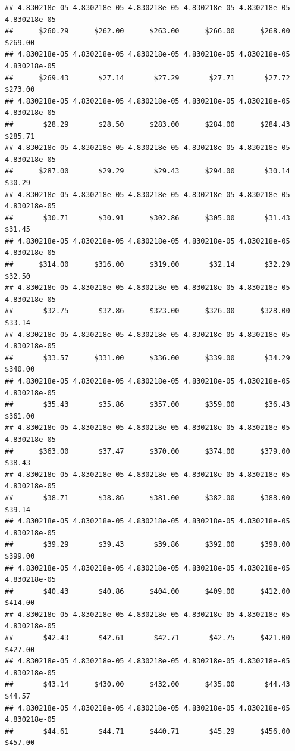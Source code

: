 \begin{verbatim}
## 4.830218e-05 4.830218e-05 4.830218e-05 4.830218e-05 4.830218e-05 4.830218e-05 
##      $260.29      $262.00      $263.00      $266.00      $268.00      $269.00 
## 4.830218e-05 4.830218e-05 4.830218e-05 4.830218e-05 4.830218e-05 4.830218e-05 
##      $269.43       $27.14       $27.29       $27.71       $27.72      $273.00 
## 4.830218e-05 4.830218e-05 4.830218e-05 4.830218e-05 4.830218e-05 4.830218e-05 
##       $28.29       $28.50      $283.00      $284.00      $284.43      $285.71 
## 4.830218e-05 4.830218e-05 4.830218e-05 4.830218e-05 4.830218e-05 4.830218e-05 
##      $287.00       $29.29       $29.43      $294.00       $30.14       $30.29 
## 4.830218e-05 4.830218e-05 4.830218e-05 4.830218e-05 4.830218e-05 4.830218e-05 
##       $30.71       $30.91      $302.86      $305.00       $31.43       $31.45 
## 4.830218e-05 4.830218e-05 4.830218e-05 4.830218e-05 4.830218e-05 4.830218e-05 
##      $314.00      $316.00      $319.00       $32.14       $32.29       $32.50 
## 4.830218e-05 4.830218e-05 4.830218e-05 4.830218e-05 4.830218e-05 4.830218e-05 
##       $32.75       $32.86      $323.00      $326.00      $328.00       $33.14 
## 4.830218e-05 4.830218e-05 4.830218e-05 4.830218e-05 4.830218e-05 4.830218e-05 
##       $33.57      $331.00      $336.00      $339.00       $34.29      $340.00 
## 4.830218e-05 4.830218e-05 4.830218e-05 4.830218e-05 4.830218e-05 4.830218e-05 
##       $35.43       $35.86      $357.00      $359.00       $36.43      $361.00 
## 4.830218e-05 4.830218e-05 4.830218e-05 4.830218e-05 4.830218e-05 4.830218e-05 
##      $363.00       $37.47      $370.00      $374.00      $379.00       $38.43 
## 4.830218e-05 4.830218e-05 4.830218e-05 4.830218e-05 4.830218e-05 4.830218e-05 
##       $38.71       $38.86      $381.00      $382.00      $388.00       $39.14 
## 4.830218e-05 4.830218e-05 4.830218e-05 4.830218e-05 4.830218e-05 4.830218e-05 
##       $39.29       $39.43       $39.86      $392.00      $398.00      $399.00 
## 4.830218e-05 4.830218e-05 4.830218e-05 4.830218e-05 4.830218e-05 4.830218e-05 
##       $40.43       $40.86      $404.00      $409.00      $412.00      $414.00 
## 4.830218e-05 4.830218e-05 4.830218e-05 4.830218e-05 4.830218e-05 4.830218e-05 
##       $42.43       $42.61       $42.71       $42.75      $421.00      $427.00 
## 4.830218e-05 4.830218e-05 4.830218e-05 4.830218e-05 4.830218e-05 4.830218e-05 
##       $43.14      $430.00      $432.00      $435.00       $44.43       $44.57 
## 4.830218e-05 4.830218e-05 4.830218e-05 4.830218e-05 4.830218e-05 4.830218e-05 
##       $44.61       $44.71      $440.71       $45.29      $456.00      $457.00 

\end{verbatim}
